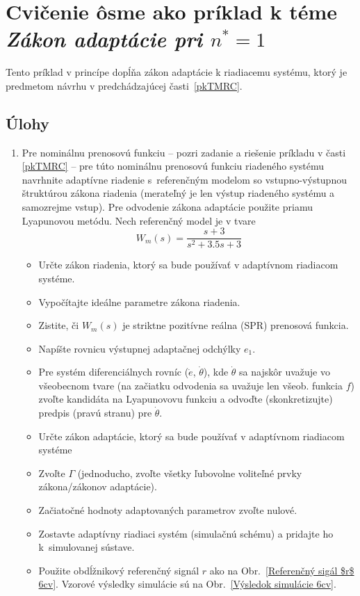 \documentclass[a4paper, 10pt, ]{article}
\begin{document}
\section{Cvičenie ôsme ako príklad k téme \emph{Zákon adaptácie pri $n^* = 1$}}




Tento príklad v princípe dopĺňa zákon adaptácie k riadiacemu systému, ktorý je predmetom návrhu v predchádzajúcej časti~\ref{pkTMRC}.



\subsection{Úlohy}


\begin{enumerate}[leftmargin=0pt, labelsep=4mm, itemsep=0pt]



	\item Pre nominálnu prenosovú funkciu -- pozri zadanie a riešenie príkladu v časti \ref{pkTMRC} -- pre túto nominálnu prenosovú funkciu riadeného systému navrhnite adaptívne riadenie s~referenčným modelom so vstupno-výstupnou štruktúrou zákona riadenia (merateľný je len výstup riadeného systému a samozrejme vstup). Pre odvodenie zákona adaptácie použite priamu Lyapunovou metódu. Nech referenčný model je v tvare
	\begin{equation}
		W_m(s) = \frac{s + 3}{ s^2 + 3.5 s + 3}
	\end{equation}

	\begin{itemize}[leftmargin=0pt, labelsep=4mm, itemsep=0pt]
		\item Určte zákon riadenia, ktorý sa bude používať v adaptívnom riadiacom systéme.
		\item Vypočítajte ideálne parametre zákona riadenia.
		\item Zistite, či $W_m(s)$ je striktne pozitívne reálna (SPR) prenosová funkcia.
		\item Napíšte rovnicu výstupnej adaptačnej odchýlky $e_1$.
		\item Pre systém diferenciálnych rovníc ($\dot e$, $\dot \theta$), kde $\dot \theta$ sa najskôr uvažuje vo všeobecnom tvare (na začiatku odvodenia sa uvažuje len všeob. funkcia $f$) zvoľte kandidáta na Lyapunovovu funkciu a odvoďte (skonkretizujte) predpis (pravú stranu) pre $\dot \theta$.
		\item Určte zákon adaptácie, ktorý sa bude používať v adaptívnom riadiacom systéme
		\item Zvoľte $\Gamma$ (jednoducho, zvoľte všetky ľubovolne voliteľné prvky zákona/zákonov adaptácie).
		\item Začiatočné hodnoty adaptovaných parametrov zvoľte nulové.
		\item Zostavte adaptívny riadiaci systém (simulačnú schému) a pridajte ho k~simulovanej sústave.
		\item Použite obdĺžnikový referenčný signál $r$ ako na Obr.~\ref{Referenčný sigál $r$ 6cv}. Vzorové výsledky simulácie sú na Obr.~\ref{Výsledok simulácie 6cv}.
	\end{itemize}

\end{enumerate}
\end{document}
